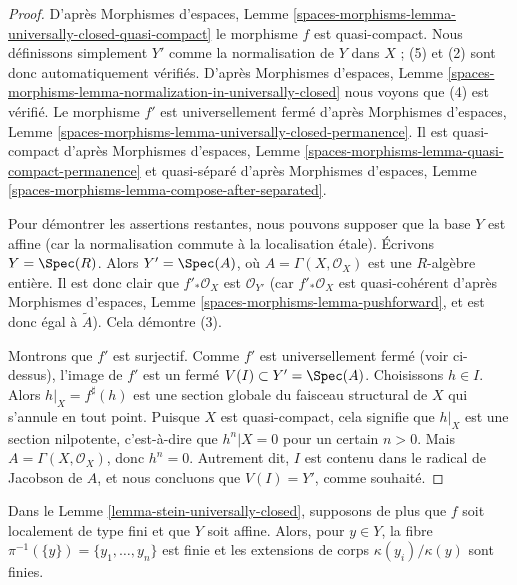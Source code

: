 \begin{proof}
D'après Morphismes d'espaces, Lemme
\ref{spaces-morphisms-lemma-universally-closed-quasi-compact}
le morphisme $f$ est quasi-compact.
Nous définissons simplement $Y'$ comme la normalisation de $Y$ dans $X$ ; (5) et (2) sont donc
automatiquement vérifiés. D'après
Morphismes d'espaces, Lemme
\ref{spaces-morphisms-lemma-normalization-in-universally-closed}
nous voyons que (4) est vérifié. Le morphisme $f'$ est universellement fermé d'après
Morphismes d'espaces, Lemme
\ref{spaces-morphisms-lemma-universally-closed-permanence}.
Il est quasi-compact d'après
Morphismes d'espaces, Lemme
\ref{spaces-morphisms-lemma-quasi-compact-permanence}
et quasi-séparé d'après
Morphismes d'espaces, Lemme
\ref{spaces-morphisms-lemma-compose-after-separated}.

\medskip\noindent
Pour démontrer les assertions restantes, nous pouvons supposer que la base $Y$ est affine
(car la normalisation commute à la localisation étale).
Écrivons $Y = \Spec(R)$. Alors $Y' = \Spec(A)$, où
$A = \Gamma(X, \mathcal{O}_X)$ est une $R$-algèbre entière.
Il est donc clair que $f'_*\mathcal{O}_X$
est $\mathcal{O}_{Y'}$ (car $f'_*\mathcal{O}_X$ est quasi-cohérent
d'après Morphismes d'espaces, Lemme
\ref{spaces-morphisms-lemma-pushforward},
et est donc égal à $\widetilde{A}$). Cela démontre (3).

\medskip\noindent
Montrons que $f'$ est surjectif. Comme $f'$ est universellement fermé (voir ci-dessus),
l'image de $f'$ est un fermé
$V(I) \subset Y' = \Spec(A)$. Choisissons $h \in I$. Alors
$h|_X = f^\sharp(h)$ est une section globale du faisceau structural de
$X$ qui s'annule en tout point. Puisque $X$ est quasi-compact, cela signifie
que $h|_X$ est une section nilpotente, c'est-à-dire que $h^n|X = 0$ pour un certain $n > 0$.
Mais $A = \Gamma(X, \mathcal{O}_X)$, donc $h^n = 0$.
Autrement dit, $I$ est contenu dans le radical de Jacobson de $A$, et nous concluons
que $V(I) = Y'$, comme souhaité.
\end{proof}

\begin{lemma}
\label{lemma-stein-universally-closed-residue-fields}
Dans le Lemme \ref{lemma-stein-universally-closed}, supposons de plus que
$f$ soit localement de type fini et que $Y$ soit affine. Alors, pour $y \in Y$, la fibre
$\pi^{-1}(\{y\}) = \{y_1, \ldots, y_n\}$ est finie et les extensions de corps
$\kappa(y_i)/\kappa(y)$ sont finies.
\end{lemma}

